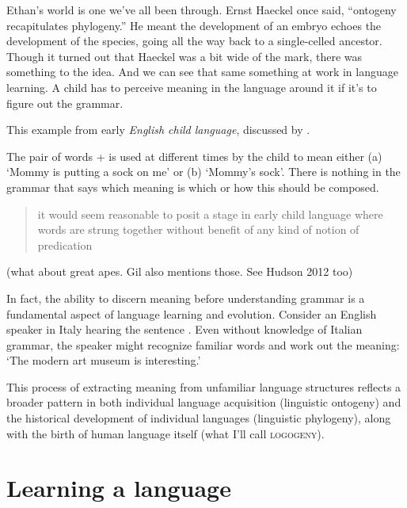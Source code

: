 Ethan's world is one we've all been through. Ernst Haeckel once said, ``ontogeny recapitulates phylogeny.'' He meant the development of an embryo echoes the development of the species, going all the way back to a single-celled ancestor. Though it turned out that Haeckel was a bit wide of the mark, there was something to the idea. And we can see that same something at work in language learning. A child has to perceive meaning in the language around it if it's to figure out the grammar. %

This example from early \textit{English child language}, discussed by \autocite{Jackendoff2014}.

    \z
\z

The pair of words  +  is used at different times by the child to mean either (a) `Mommy is putting a sock on me' or (b) `Mommy's sock'. There is nothing in the grammar that says which meaning is which or how this should be composed. 

\begin{quote}
    it would seem reasonable to posit a stage in early child language where words are strung together without benefit of any kind of notion of predication \autocite[62]{Gil2014}
\end{quote}

(what about great apes. Gil also mentions those. See Hudson 2012 too)

In fact, the ability to discern meaning before understanding grammar is a fundamental aspect of language learning and evolution. Consider an English speaker in Italy hearing the sentence . Even without knowledge of Italian grammar, the speaker might recognize familiar words and work out the meaning: `The modern art museum is interesting.'

This process of extracting meaning from unfamiliar language structures reflects a broader pattern in both individual language acquisition (linguistic ontogeny) and the historical development of individual languages (linguistic phylogeny), along with the birth of human language itself (what I'll call \textsc{logogeny}). 

\section{Learning a language}

